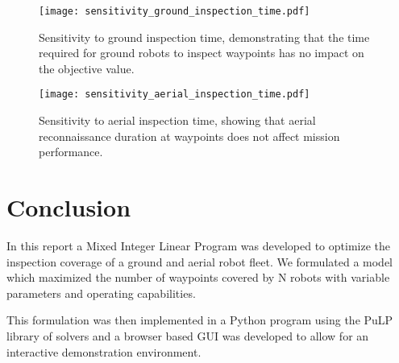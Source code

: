 \documentclass{article}
\begin{document}
	\begin{figure}[htbp]
		\centering
		\texttt{[image: sensitivity\_ground\_inspection\_time.pdf]}
		\caption{Sensitivity to ground inspection time, demonstrating that the time required for ground robots to inspect waypoints has no impact on the objective value.}
		\label{fig:ground_inspection}
	\end{figure}

	\begin{figure}[htbp]
		\centering
		\texttt{[image: sensitivity\_aerial\_inspection\_time.pdf]}
		\caption{Sensitivity to aerial inspection time, showing that aerial reconnaissance duration at waypoints does not affect mission performance.}
		\label{fig:aerial_inspection}
	\end{figure}


	\newpage
	\section{Conclusion}\label{conclusion}

	In this report a Mixed Integer Linear Program was developed to optimize the inspection coverage of a ground and aerial robot fleet. 
	We formulated a model which maximized the number of waypoints covered by N robots with variable parameters and operating capabilities.

	This formulation was then implemented in a Python program using the PuLP library of solvers and a browser based GUI was developed to allow for an interactive demonstration environment.

	\newpage
	
	\nocite{*}
	
\end{document}
